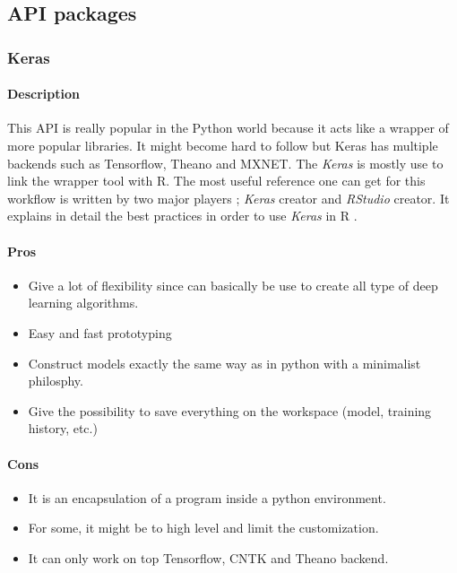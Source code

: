 \documentclass[letter]{article}\usepackage[]{graphicx}\usepackage[]{color}
\begin{document}
\subsection{API packages}

\subsubsection{Keras}
\paragraph{Description}
This API is really popular in the Python world because it acts like a wrapper of more popular libraries. It might become hard to follow but Keras has multiple backends such as Tensorflow, Theano and MXNET. The \textit{Keras} \cite{keras2019} is mostly use to link the wrapper tool with R. The most useful reference one can get for this workflow is written by two major players ; \textit{Keras} creator and \textit{RStudio} creator. It explains in detail the best practices in order to use \textit{Keras} in R \cite{chollet2018deep}.

\paragraph{Pros}
\begin{itemize}
\item Give a lot of flexibility since can basically be use to create all type of deep learning algorithms.
\item Easy and fast prototyping
\item Construct models exactly the same way as in python with a minimalist philosphy.
\item Give the possibility to save everything on the workspace (model, training history, etc.)
\end{itemize}
\paragraph{Cons}
\begin{itemize}
\item It is an encapsulation of a program inside a python environment.
\item For some, it might be to high level and limit the customization.
\item It can only work on top Tensorflow, CNTK and Theano backend.
\end{itemize}
\end{document}
